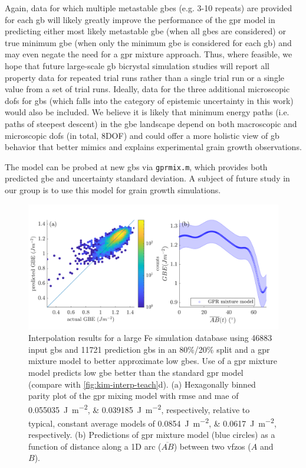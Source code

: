 \documentclass[final,twocolumn,12pt]{elsarticle}
\newcommand{\matlab}[1]{\mbox{\lstinline[style=Matlab-editor]{#1}}}
\newcommand{\inpt}{input}
\newcommand{\outpt}{prediction}
\begin{document}
Again, data for which multiple metastable \glspl{gbe} (e.g. 3-10 repeats) are provided for each \gls{gb} will likely greatly improve the performance of the \gls{gpr} model in predicting either most likely metastable \gls{gbe} (when all \glspl{gbe} are considered) or true minimum \gls{gbe} (when only the minimum \gls{gbe} is considered for each \gls{gb}) and may even negate the need for a \gls{gpr} mixture approach. Thus, where feasible, we hope that future large-scale \gls{gb} bicrystal simulation studies will report all property data for repeated trial runs rather than a single trial run or a single value from a set of trial runs. Ideally, data for the three additional microscopic \glspl{dof} for \glspl{gb} (which falls into the category of epistemic uncertainty in this work) would also be included. We believe it is likely that minimum energy paths (i.e. paths of steepest descent) in the \gls{gbe} landscape depend on both macroscopic and microscopic \glspl{dof} (in total, 8DOF) and could offer a more holistic view of \gls{gb} behavior that better mimics and explains experimental grain growth observations.

The model can be probed at new \glspl{gb} via \matlab{gprmix.m}, which provides both predicted \gls{gbe} and uncertainty standard deviation. A subject of future study in our group is to use this model for grain growth simulations.

\begin{figure}
    \centering
    \includegraphics{kim-interp.png}
    \caption{Interpolation results for a large Fe simulation database \cite{kimPhasefieldModeling3D2014} using \num{46883} \inpt{} \glspl{gb} and \num{11721} \outpt{} \glspl{gb} in an 80\%/20\% split and a \gls{gpr} mixture model to better approximate low \glspl{gbe}. Use of a \gls{gpr} mixture model predicts low \gls{gbe} better than the standard \gls{gpr} model (compare with \cref{fig:kim-interp-teach}d). (a) Hexagonally binned parity plot of the \gls{gpr} mixing model with \gls{rmse} and \gls{mae} of \SIlist{0.055035;0.039185}{\J\per\square\meter}, respectively, relative to typical, constant average models of \SIlist{0.0854;0.0617}{\joule\per\square\meter}, respectively. (b) Predictions of \gls{gpr} mixture model (blue circles) as a function of distance along a 1D arc ($\overline{AB}$) between two \glspl{vfzo} ($A$ and $B$). }
    \label{fig:kim-interp}
\end{figure}
\end{document}
